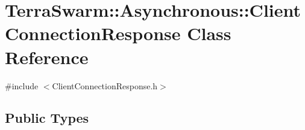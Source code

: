 \hypertarget{class_terra_swarm_1_1_asynchronous_1_1_client_connection_response}{\section{Terra\-Swarm\-:\-:Asynchronous\-:\-:Client\-Connection\-Response Class Reference}
\label{class_terra_swarm_1_1_asynchronous_1_1_client_connection_response}
}


{\ttfamily \#include $<$Client\-Connection\-Response.\-h$>$}

\subsection*{Public Types}
